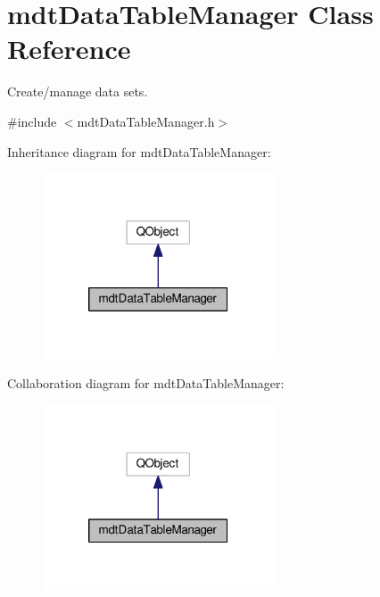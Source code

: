 \hypertarget{classmdt_data_table_manager}{\section{mdt\-Data\-Table\-Manager Class Reference}
\label{classmdt_data_table_manager}
}


Create/manage data sets.  




{\ttfamily \#include $<$mdt\-Data\-Table\-Manager.\-h$>$}



Inheritance diagram for mdt\-Data\-Table\-Manager\-:
\nopagebreak
\begin{figure}[H]
\begin{center}
\leavevmode
\includegraphics[width=194pt]{classmdt_data_table_manager__inherit__graph}
\end{center}
\end{figure}


Collaboration diagram for mdt\-Data\-Table\-Manager\-:
\nopagebreak
\begin{figure}[H]
\begin{center}
\leavevmode
\includegraphics[width=194pt]{classmdt_data_table_manager__coll__graph}
\end{center}
\end{figure}

